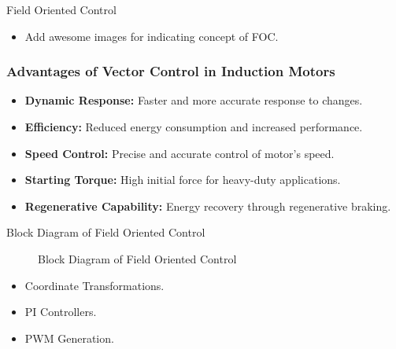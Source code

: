 


\begin{frame}{}
	\maketitle
\end{frame}

\begin{frame}{Field Oriented Control}
	\begin{itemize}
		\item Add awesome images for indicating concept of FOC.
	\end{itemize}
\end{frame}


\begin{frame}
	\frametitle{Advantages of Vector Control in Induction Motors}
	\begin{itemize}
		\item \textbf{Dynamic Response:} Faster and more accurate response to changes.
		\item \textbf{Efficiency:} Reduced energy consumption and increased performance.
		\item \textbf{Speed Control:} Precise and accurate control of motor's speed.
		\item \textbf{Starting Torque:} High initial force for heavy-duty applications.
		\item \textbf{Regenerative Capability:} Energy recovery through regenerative braking.
	\end{itemize}
\end{frame}


\begin{frame}{Block Diagram of Field Oriented Control}
	\begin{figure}
		\centering

		\caption{Block Diagram of Field Oriented Control}
	\end{figure}
	\begin{itemize}
		\item Coordinate Transformations.
		\item PI Controllers.
		\item PWM Generation.
	\end{itemize}
\end{frame}

